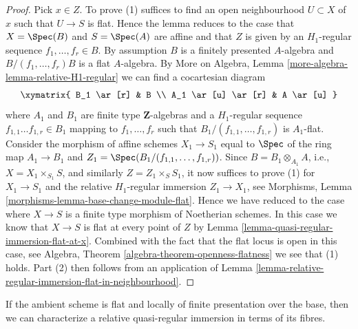 \begin{proof}
Pick $x \in Z$. To prove (1) suffices to find an open neighbourhood
$U \subset X$ of $x$ such that $U \to S$ is flat. Hence the lemma reduces
to the case that $X = \Spec(B)$ and $S = \Spec(A)$ are affine
and that $Z$ is given by an $H_1$-regular sequence $f_1, \ldots, f_r \in B$.
By assumption $B$ is a finitely presented $A$-algebra and
$B/(f_1, \ldots, f_r)B$ is a flat $A$-algebra. By
More on Algebra, Lemma \ref{more-algebra-lemma-relative-H1-regular}
we can find a cocartesian diagram
$$
\xymatrix{
B_1 \ar[r] & B \\
A_1 \ar[u] \ar[r] & A \ar[u]
}
$$
where $A_1$ and $B_1$ are finite type $\mathbf{Z}$-algebras
and a $H_1$-regular sequence $f_{1, 1} \ldots f_{1, r} \in B_1$
mapping to $f_1, \ldots, f_r$ such that
$B_1/(f_{1, 1}, \ldots, f_{1, r})$ is $A_1$-flat.
Consider the morphism of affine schemes
$X_1 \to S_1$ equal to $\Spec$ of the
ring map $A_1 \to B_1$ and
$Z_1 = \Spec(B_1/(f_{1, 1}, \ldots, f_{1, r}))$.
Since $B = B_1 \otimes_{A_1} A$, i.e., $X = X_1 \times_{S_1} S$,
and similarly $Z = Z_1 \times_S S_1$,
it now suffices to prove (1) for $X_1 \to S_1$ and the relative
$H_1$-regular immersion $Z_1 \to X_1$, see
Morphisms, Lemma \ref{morphisms-lemma-base-change-module-flat}.
Hence we have reduced to the case where $X \to S$ is a finite type
morphism of Noetherian schemes.
In this case we know that $X \to S$ is flat at every
point of $Z$ by
Lemma \ref{lemma-quasi-regular-immersion-flat-at-x}.
Combined with the fact that the flat locus is open in this case, see
Algebra, Theorem \ref{algebra-theorem-openness-flatness}
we see that (1) holds. Part (2) then follows from an application of
Lemma \ref{lemma-relative-regular-immersion-flat-in-neighbourhood}.
\end{proof}

\noindent
If the ambient scheme is flat and locally of finite presentation over
the base, then we can characterize a relative
quasi-regular immersion in terms of its fibres.


